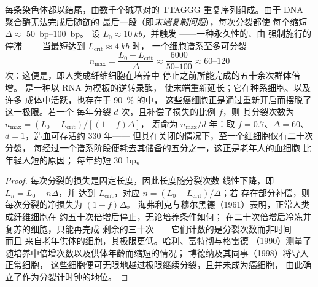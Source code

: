 \begin{theorem}[端粒与海弗利克极限]\label{thm:b3:stem-cells:hayflick}
每条染色体都以\emph{}结尾，由数千个碱基对的
TTAGGG 重复序列组成。由于 DNA 聚合酶无法完成后随链的
最后一段（即\emph{末端复制问题}），每次分裂都使
每个缩短 $\Delta \approx$ \qtyrange{50}{100}{bp}。
设 $L_{0} \approx \qty{10}{kb}$，并触发
\emph{}——一种永久性的、由  强制施行的停滞——
当最短达到 $L_{\mathrm{crit}} \approx \qty{4}{kb}$ 时，
一个细胞谱系至多可分裂
\[
n_{\max} = \frac{L_{0} - L_{\mathrm{crit}}}{\Delta} \approx \frac{6000}{50\text{--}100} \approx 60\text{--}120
\]
次：这便是\emph{}，即人类成纤维细胞在培养中
停止之前所能完成的五十余次群体倍增。
\emph{}是一种以 RNA 为模板的逆转录酶，
使末端重新延长；它在种系细胞、以及许多
成体中活跃，也存在于 \qty{90}{\%} 的中，
这些癌细胞正是通过重新开启而摆脱了这一极限。若一个
每年分裂 $d$ 次，且补偿了损失的比例 $f$，则
其分裂次数为 $n_{\max} = (L_{0} - L_{\mathrm{crit}})/[(1 - f)\Delta]$，
寿命为 $n_{\max}/d$ 年：取 $f = 0.7$、$\Delta
= 60$、$d = 1$，造血可存活约 330 年——
但其在关闭的情况下，至一个红细胞仅有二十次分裂，
每经过一个谱系阶段便耗去其储备的五分之一，这正是老年人的血细胞
比年轻人短的原因；
每年约短 \qty{30}{bp}。
\end{theorem}
\begin{proof}
每次分裂的损失是固定长度，因此长度随分裂次数
线性下降，即 $L_{n} = L_{0} - n\Delta$，并
达到 $L_{\mathrm{crit}}$，对应 $n = (L_{0} - L_{\mathrm{crit}})/\Delta$；若
存在部分补偿，则每次分裂的净损失为 $(1 - f)\Delta$。
海弗利克与穆尔黑德（1961）表明，正常人类成纤维细胞在
约五十次倍增后停止，无论培养条件如何；
在二十次倍增后冷冻并复苏的细胞，只能再完成
剩余的三十次——它们计数的是分裂次数而非时间——而且
来自老年供体的细胞，其极限更低。哈利、富特彻与格雷德
（1990）测量了随培养中倍增次数以及供体年龄而缩短的情况；
博德纳及其同事（1998）将导入正常细胞，
这些细胞便可无限地越过极限继续分裂，且并未成为癌细胞，
由此确立了作为分裂计时钟的地位。
\end{proof}


